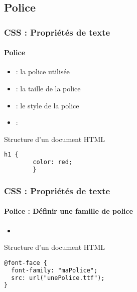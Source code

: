 \documentclass[xcolor=table]{beamer}
\begin{document}
\subsection{Police}

\begin{frame}[fragile]
\frametitle{CSS : Propriétés de texte}
\framesubtitle{Police}

\begin{minipage}{0.60\textwidth}
	\begin{itemize}
		\item {} : la police utilisée
		\item {} : la taille de la police
		\item {} : le style de la police
		\item {} : 
	\end{itemize}
\end{minipage}
%
\begin{minipage}{0.38\textwidth}
	\begin{exampleblock}{Structure d'un document HTML}
		\lstset{escapeinside=**}
		\scriptsize\bfseries
		\begin{lstlisting}[language={html}]
		h1 {
		color: red;
		}
		\end{lstlisting}
	\end{exampleblock}
\end{minipage}
\end{frame}

\begin{frame}[fragile]
\frametitle{CSS : Propriétés de texte}
\framesubtitle{Police : Définir une famille de police}

\begin{minipage}{0.60\textwidth}
	\begin{itemize}
		\item {}
	\end{itemize}
\end{minipage}
%
\begin{minipage}{0.38\textwidth}
\begin{exampleblock}{Structure d'un document HTML}
\lstset{escapeinside=**}
\scriptsize\bfseries
\begin{lstlisting}[language={html}]
@font-face {
  font-family: "maPolice";
  src: url("unePolice.ttf");
}
\end{lstlisting}
\end{exampleblock}
\end{minipage}
\end{frame}
\end{document}
